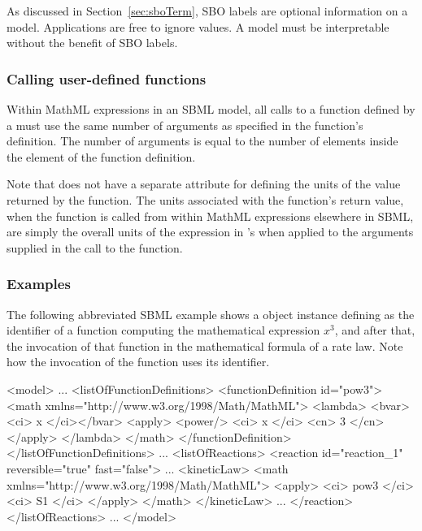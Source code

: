 As discussed in Section~\ref{sec:sboTerm}, SBO labels are optional
information on a model.  Applications are free to ignore
 values.  A model must be interpretable without the
benefit of SBO labels.




\subsubsection{Calling user-defined functions}
\label{sec:functiondefinition-calling}

Within MathML expressions in an SBML model, all calls to a
function defined by a \FunctionDefinition must use the same number
of arguments as specified in the function's definition.  The
number of arguments is equal to the number of 
elements inside the  element of the function
definition.

Note that \FunctionDefinition does not have a separate attribute
for defining the units of the value returned by the function.  The
units associated with the function's return value, when the
function is called from within MathML expressions elsewhere in
SBML, are simply the overall units of the expression in
\FunctionDefinition's  when applied to the arguments
supplied in the call to the function.


\subsubsection{Examples}

The following abbreviated SBML example shows a \FunctionDefinition
object instance defining  as the identifier of a function
computing the mathematical expression $x^{3}$, and after that, the
invocation of that function in the mathematical formula of a rate
law.  Note how the invocation of the function uses its identifier.

\begin{example}
<model>
    ...
    <listOfFunctionDefinitions>
        <functionDefinition id="pow3">
            <math xmlns="http://www.w3.org/1998/Math/MathML">
                <lambda>
                    <bvar><ci> x </ci></bvar>
                    <apply>
                        <power/>
                        <ci> x </ci>
                        <cn> 3 </cn>
                    </apply>
                </lambda>
            </math>
        </functionDefinition>
    </listOfFunctionDefinitions>
    ...
    <listOfReactions>
        <reaction id="reaction_1" reversible="true" fast="false">
            ...
            <kineticLaw>
                <math xmlns="http://www.w3.org/1998/Math/MathML">
                    <apply>
                        <ci> pow3 </ci>
                        <ci> S1 </ci>
                     </apply>
                </math>
            </kineticLaw>
            ...
        </reaction>
    </listOfReactions>
    ...
</model>\end{example}


